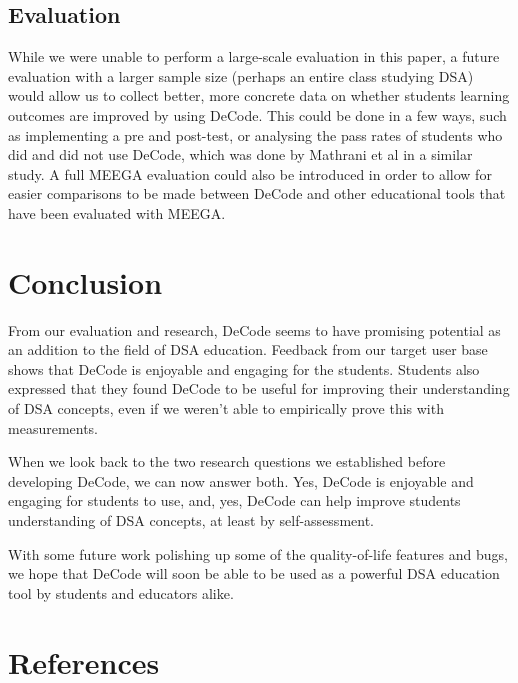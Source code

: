 \documentclass[11pt]{article}
\begin{document}
\subsection{Evaluation}
While we were unable to perform a large-scale evaluation in this paper, a future evaluation with a larger sample size (perhaps an entire class studying DSA) would allow us to collect better, more concrete data on whether students learning outcomes are improved by using DeCode. This could be done in a few ways, such as implementing a pre and post-test, or analysing the pass rates of students who did and did not use DeCode, which was done by Mathrani et al\cite{mathrani} in a similar study. A full MEEGA\cite{Rafael} evaluation could also be introduced in order to allow for easier comparisons to be made between DeCode and other educational tools that have been evaluated with MEEGA.
\section{Conclusion}
From our evaluation and research, DeCode seems to have promising potential as an addition to the field of DSA education. Feedback from our target user base shows that DeCode is enjoyable and engaging for the students. Students also expressed that they found DeCode to be useful for improving their understanding of DSA concepts, even if we weren't able to empirically prove this with measurements.\par
When we look back to the two research questions we established before developing DeCode, we can now answer both. Yes, DeCode is enjoyable and engaging for students to use, and, yes, DeCode can help improve students understanding of DSA concepts, at least by self-assessment.\par
With some future work polishing up some of the quality-of-life features and bugs, we hope that DeCode will soon be able to be used as a powerful DSA education tool by students and educators alike.

\begingroup

\section*{References}
  \vspace{2mm}

  \renewcommand{\section}[2]{}

  \begin{spacing}{1.0}

    
    \small
    

  \end{spacing}

\endgroup
\end{document}
